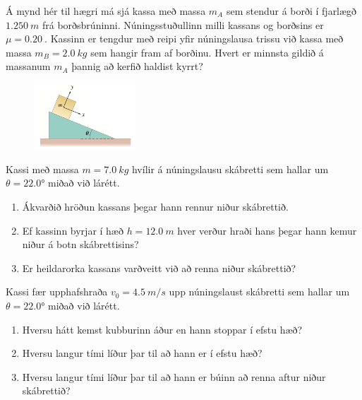 \begin{enumerate}[label = \textbf{Dæmi \thechapter.\arabic*.}]
\begin{minipage}{\linewidth}
\item Á mynd hér til hægri má sjá kassa með massa $m_A$ sem stendur á borði í fjarlægð $\SI{1.250}{m}$ frá borðsbrúninni. Núningsstuðullinn milli kassans og borðsins er $\mu = \SI{0.20}{}$. Kassinn er tengdur með reipi yfir núningslausa trissu við kassa með massa $m_B = \SI{2.0}{kg}$ sem hangir fram af borðinu. Hvert er minnsta gildið á massanum $m_A$ þannig að kerfið haldist kyrrt?

\end{minipage}

\vspace{0.3cm}

\begin{minipage}{\linewidth}
\begin{figure}
\includegraphics[width=1.5in]{images/skabr2.png}
\end{figure}

\item Kassi með massa $m = \SI{7.0}{kg}$ hvílir á núningslausu skábretti sem hallar um $\theta = \ang{22.0}$ miðað við lárétt.
\begin{enumerate}[label = \textbf{(\alph*)}]
    \item Ákvarðið hröðun kassans þegar hann rennur niður skábrettið.
    \item Ef kassinn byrjar í hæð $h = \SI{12.0}{m}$ hver verður hraði hans þegar hann kemur niður á botn skábrettisins?
    \item Er heildarorka kassans varðveitt við að renna niður skábrettið?
\end{enumerate}

\end{minipage}

\item Kassi fær upphafshraða $v_0 = \SI{4.5}{m/s}$ upp núningslaust skábretti sem hallar um $\theta = \ang{22.0}$ miðað við lárétt.
\begin{enumerate}[label = \textbf{(\alph*)}]
    \item Hversu hátt kemst kubburinn áður en hann stoppar í efstu hæð?
    \item Hversu langur tími líður þar til að hann er í efstu hæð?
    \item Hversu langur tími líður þar til að hann er búinn að renna aftur niður skábrettið?
\end{enumerate}


\end{enumerate}
